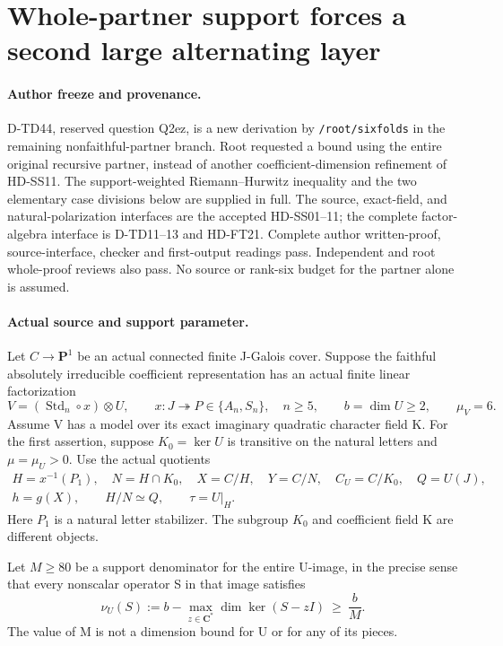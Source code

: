 \section{Whole-partner support forces a second large alternating layer}
\label{sec:standard-partner-support-gap}

\paragraph{Author freeze and provenance.}
D-TD44, reserved question Q2ez, is a new derivation by
\texttt{/root/sixfolds} in the remaining nonfaithful-partner branch.
Root requested a bound using the entire original recursive partner,
instead of another coefficient-dimension refinement of HD-SS11.
The support-weighted Riemann--Hurwitz inequality and the two elementary
case divisions below are supplied in full.  The source, exact-field,
and natural-polarization interfaces are the accepted HD-SS01--11;
the complete factor-algebra interface is D-TD11--13 and HD-FT21.
Complete author written-proof, source-interface, checker and first-output
readings pass.  Independent and root whole-proof reviews also pass.
No source or rank-six budget for the partner alone is assumed.

\paragraph{Actual source and support parameter.}
Let \(C\to\mathbf P^1\) be an actual connected finite J-Galois cover.
Suppose the faithful absolutely irreducible coefficient representation
has an actual finite linear factorization
\[
 V=(\operatorname{Std}_n\circ x)\otimes U,\qquad
 x:J\twoheadrightarrow P\in\{A_n,S_n\},\quad n\ge5,
 \qquad b=\dim U\ge2,\qquad \mu_V=6.
 \tag{SPG.1}
\]
Assume V has a model over its exact imaginary quadratic character field K.
For the first assertion, suppose \(K_0=\ker U\) is transitive on the
natural letters and \(\mu=\mu_U>0\).  Use the actual quotients
\[
 \begin{gathered}
 H=x^{-1}(P_1),\quad N=H\cap K_0,\quad
 X=C/H,\quad Y=C/N,\quad C_U=C/K_0,\quad Q=U(J),\\
 h=g(X),\qquad H/N\simeq Q,\qquad \tau=U|_H.
 \end{gathered}
 \tag{SPG.2}
\]
Here \(P_1\) is a natural letter stabilizer.  The subgroup \(K_0\)
and coefficient field K are different objects.

Let \(M\ge80\) be a support denominator for the entire U-image,
in the precise sense that every nonscalar operator S in that image satisfies
\[
 \nu_U(S):=b-\max_{z\in\mathbf C^*}\dim\ker(S-zI)
                  \ \ge\ \frac bM.
 \tag{SPG.3}
\]
The value of M is not a dimension bound for U or for any of its pieces.


